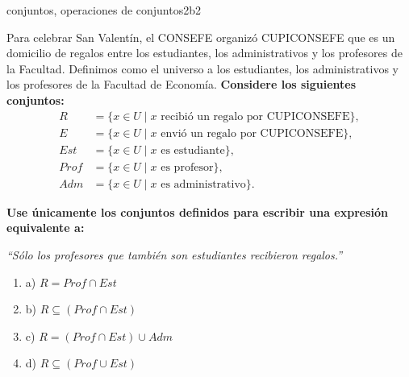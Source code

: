 \documentclass{article}
\begin{document}
\begin{question}{17}{conjuntos, operaciones de conjuntos}{2}{b}{2}{
Para celebrar San Valentín, el CONSEFE organizó CUPICONSEFE que es un domicilio de regalos entre los estudiantes, los administrativos y los profesores de la Facultad. Definimos como el universo a los estudiantes, los administrativos y los profesores de la Facultad de Economía. \textbf{Considere los siguientes conjuntos:}
\[
\begin{aligned}
R &= \{x \in U \mid x \text{ recibió un regalo por CUPICONSEFE}\},\\
E &= \{x \in U \mid x \text{ envió un regalo por CUPICONSEFE}\},\\
Est &= \{x \in U \mid x \text{ es estudiante}\},\\
Prof &= \{x \in U \mid x \text{ es profesor}\},\\
Adm &= \{x \in U \mid x \text{ es administrativo}\}.
\end{aligned}
\]

\textbf{Use únicamente los conjuntos definidos para escribir una expresión equivalente a:} \smallskip

\textit{“Sólo los profesores que también son estudiantes recibieron regalos.”} \smallskip

\begin{enumerate}
    \item a) \( R = Prof \cap Est \)  
    \item b) \( R \subseteq (Prof \cap Est) \)  
    \item c) \( R = (Prof \cap Est) \cup Adm \)  
    \item d) \( R \subseteq (Prof \cup Est) \)  
\end{enumerate}
}
\end{question}
\end{document}
